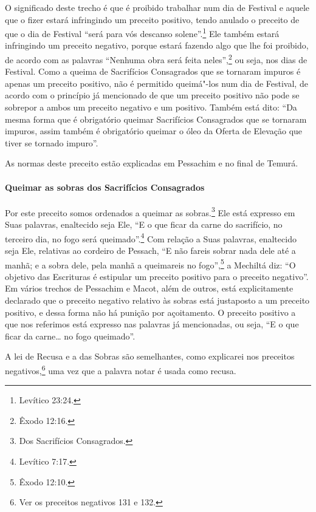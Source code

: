 \begin{multicols}{2}
O significado deste trecho é que é proibido trabalhar num dia de
Festival e aquele que o fizer estará infringindo um preceito positivo,
tendo anulado o preceito de que o dia de Festival ``será para vós
descanso solene''.\footnote{Levítico 23:24.} Ele também estará infringindo um
preceito negativo, porque estará fazendo algo que lhe foi proibido, de
acordo com as palavras ``Nenhuma obra será feita neles'',\footnote{Êxodo 12:16.}
ou seja, nos dias de Festival. Como a queima de Sacrifícios Consagrados
que se tornaram impuros é apenas um preceito positivo, não é permitido
queimá"-los num dia de Festival, de acordo com o princípio já mencionado
de que um preceito positivo não pode se sobrepor a ambos um preceito
negativo e um positivo. Também está dito: ``Da mesma forma que é
obrigatório queimar Sacrifícios Consagrados que se tornaram impuros,
assim também é obrigatório queimar o óleo da Oferta de Elevação que
tiver se tornado impuro''.

As normas deste preceito estão explicadas em Pessachim\starr{} e no final de Temurá\starr.

\paragraph{Queimar as sobras dos Sacrifícios Consagrados}

Por este preceito somos ordenados a queimar as
sobras.\footnote{Dos Sacrifícios Consagrados.} Ele está expresso em Suas palavras,
enaltecido seja Ele, ``E o que ficar da carne do sacrifício, no terceiro dia, no fogo será queimado''.\footnote{Levítico 7:17.} Com
relação a Suas palavras, enaltecido seja Ele, relativas ao cordeiro de
Pessach\starr, ``E não fareis sobrar nada dele até a manhã; e a sobra
dele, pela manhã a queimareis no fogo'',\footnote{Êxodo 12:10.} a Mechiltá\starr{} diz:
``O objetivo das Escrituras é estipular um preceito positivo para o
preceito negativo''. Em vários trechos de Pessachim\starr{} e Macot\starr, além de
outros, está explicitamente declarado que o preceito negativo relativo
às sobras está justaposto a um preceito positivo, e dessa forma não há
punição por açoitamento. O preceito positivo a que nos referimos está
expresso nas palavras já mencionadas, ou seja, ``E o que ficar da
carne\ldots{} no fogo queimado''.

A lei de Recusa e a das Sobras são semelhantes, como explicarei
nos preceitos negativos,\footnote{Ver os preceitos negativos 131 e 132.} uma vez que a palavra notar\starr{} é usada como recusa.


\end{multicols}
